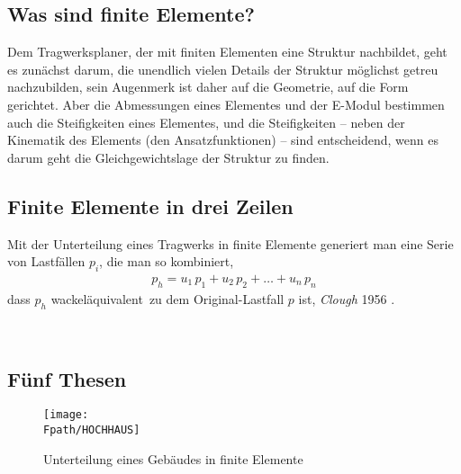 \textcolor{chapterTitleBlue}{\chapter{Was sind finite Elemente?}}

Dem Tragwerksplaner, der mit finiten Elementen eine Struktur nachbildet, geht es zun\"{a}chst darum, die unendlich vielen Details der Struktur m\"{o}glichst getreu nachzubilden, sein Augenmerk ist daher auf die Geometrie, auf die Form gerichtet. Aber die Abmessungen eines Elementes und der E-Modul bestimmen auch die Steifigkeiten eines Elementes, und die Steifigkeiten -- neben der Kinematik des Elements (den Ansatzfunktionen) --  sind entscheidend, wenn es darum geht die Gleichgewichtslage der Struktur zu finden.

{\textcolor{sectionTitleBlue}{\section{Finite Elemente in drei Zeilen}}}

\hspace*{-12pt}\colorbox{highlightBlue}{\parbox{0.98\textwidth}{ Mit der Unterteilung eines Tragwerks in finite Elemente generiert man eine Serie von Lastf\"{a}llen $p_i$, die man so kombiniert,
\begin{align}
p_h = u_1\,p_1 + u_2\,p_2 + \ldots + u_n\,p_n
\end{align}
dass $p_h$ \glq wackel\"{a}quivalent\grq\ zu dem Original-Lastfall $p$ ist, {\em Clough\/} 1956 \cite{Turner}.}}\\

{\textcolor{sectionTitleBlue}{\section{F\"{u}nf Thesen}}}

\begin{figure}[tbp] \centering
\texttt{[image: \\Fpath/HOCHHAUS]}
\caption{Unterteilung eines Geb\"{a}udes in finite Elemente} \label{Hochhaus}
\end{figure}%

